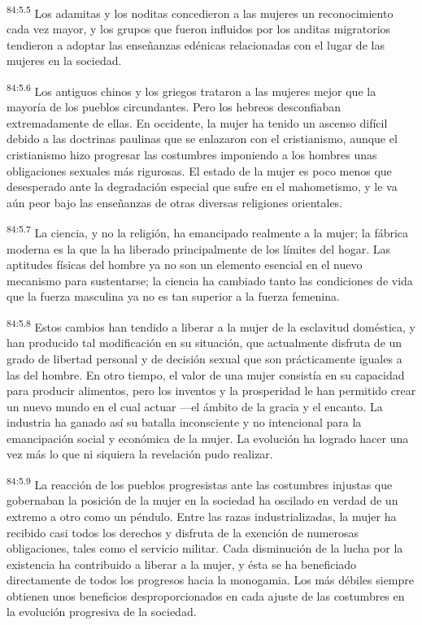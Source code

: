 \documentclass[twoside, 11pt]{book}
\begin{document}
\par
\textsuperscript{84:5.5} Los adamitas y los noditas concedieron a las mujeres un reconocimiento cada vez mayor, y los grupos que fueron influidos por los anditas migratorios tendieron a adoptar las enseñanzas edénicas relacionadas con el lugar de las mujeres en la sociedad.

\par
\textsuperscript{84:5.6} Los antiguos chinos y los griegos trataron a las mujeres mejor que la mayoría de los pueblos circundantes. Pero los hebreos desconfiaban extremadamente de ellas. En occidente, la mujer ha tenido un ascenso difícil debido a las doctrinas paulinas que se enlazaron con el cristianismo, aunque el cristianismo hizo progresar las costumbres imponiendo a los hombres unas obligaciones sexuales más rigurosas. El estado de la mujer es poco menos que desesperado ante la degradación especial que sufre en el mahometismo, y le va aún peor bajo las enseñanzas de otras diversas religiones orientales.

\par
\textsuperscript{84:5.7} La ciencia, y no la religión, ha emancipado realmente a la mujer; la fábrica moderna es la que la ha liberado principalmente de los límites del hogar. Las aptitudes físicas del hombre ya no son un elemento esencial en el nuevo mecanismo para sustentarse; la ciencia ha cambiado tanto las condiciones de vida que la fuerza masculina ya no es tan superior a la fuerza femenina.

\par
\textsuperscript{84:5.8} Estos cambios han tendido a liberar a la mujer de la esclavitud doméstica, y han producido tal modificación en su situación, que actualmente disfruta de un grado de libertad personal y de decisión sexual que son prácticamente iguales a las del hombre. En otro tiempo, el valor de una mujer consistía en su capacidad para producir alimentos, pero los inventos y la prosperidad le han permitido crear un nuevo mundo en el cual actuar ---el ámbito de la gracia y el encanto. La industria ha ganado así su batalla inconsciente y no intencional para la emancipación social y económica de la mujer. La evolución ha logrado hacer una vez más lo que ni siquiera la revelación pudo realizar.

\par
\textsuperscript{84:5.9} La reacción de los pueblos progresistas ante las costumbres injustas que gobernaban la posición de la mujer en la sociedad ha oscilado en verdad de un extremo a otro como un péndulo. Entre las razas industrializadas, la mujer ha recibido casi todos los derechos y disfruta de la exención de numerosas obligaciones, tales como el servicio militar. Cada disminución de la lucha por la existencia ha contribuido a liberar a la mujer, y ésta se ha beneficiado directamente de todos los progresos hacia la monogamia. Los más débiles siempre obtienen unos beneficios desproporcionados en cada ajuste de las costumbres en la evolución progresiva de la sociedad.
\end{document}
